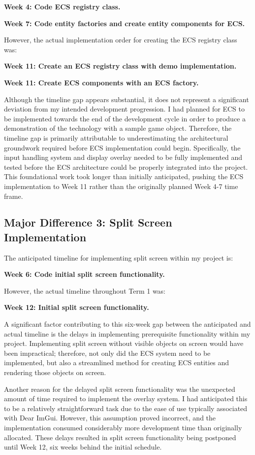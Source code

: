 \documentclass{article}
\begin{document}
\textbf{Week 4: Code ECS registry class.}

\textbf{Week 7: Code entity factories and create entity components for ECS.}

However, the actual implementation order for creating the ECS registry class was:

\textbf{Week 11: Create an ECS registry class with demo implementation.}

\textbf{Week 11: Create ECS components with an ECS factory.}

Although the timeline gap appears substantial, it does not represent a significant deviation from my intended development progression. I had planned for ECS to be implemented towards the end of the development cycle in order to produce a demonstration of the technology with a sample game object. Therefore, the timeline gap is primarily attributable to underestimating the architectural groundwork required before ECS implementation could begin. Specifically, the input handling system and display overlay needed to be fully implemented and tested before the ECS architecture could be properly integrated into the project. This foundational work took longer than initially anticipated, pushing the ECS implementation to Week 11 rather than the originally planned Week 4-7 time frame.

\subsection{Major Difference 3: Split Screen Implementation}
The anticipated timeline for implementing split screen within my project is:

\textbf{Week 6: Code initial split screen functionality.}

However, the actual timeline throughout Term 1 was:

\textbf{Week 12: Initial split screen functionality.}

A significant factor contributing to this six-week gap between the anticipated and actual timeline is the delays in implementing prerequisite functionality within my project. Implementing split screen without visible objects on screen would have been impractical; therefore, not only did the ECS system need to be implemented, but also a streamlined method for creating ECS entities and rendering those objects on screen. 

Another reason for the delayed split screen functionality was the unexpected amount of time required to implement the overlay system. I had anticipated this to be a relatively straightforward task due to the ease of use typically associated with Dear ImGui. However, this assumption proved incorrect, and the implementation consumed considerably more development time than originally allocated. These  delays resulted in split screen functionality being postponed until Week 12, six weeks behind the initial schedule.
\end{document}
